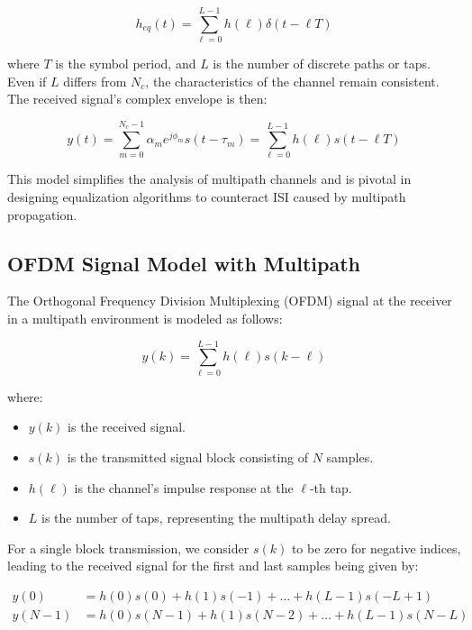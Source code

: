 \begin{equation}
    h_{eq}(t) = \sum_{\ell=0}^{L-1} h(\ell) \delta(t - \ell T)
\end{equation}

where \( T \) is the symbol period, and \( L \) is the number of discrete paths or taps. Even if \( L \) differs from \( N_c \), the characteristics of the channel remain consistent. The received signal's complex envelope is then:

\begin{equation}
    y(t) = \sum_{m=0}^{N_c-1} \alpha_m e^{j\phi_m} s(t - \tau_m) = \sum_{\ell=0}^{L-1} h(\ell) s(t - \ell T)
\end{equation}

This model simplifies the analysis of multipath channels and is pivotal in designing equalization algorithms to counteract ISI caused by multipath propagation.

\subsection*{OFDM Signal Model with Multipath}

The Orthogonal Frequency Division Multiplexing (OFDM) signal at the receiver in a multipath environment is modeled as follows:

\begin{equation}
    y(k) = \sum_{\ell=0}^{L-1} h(\ell) s(k - \ell)
\end{equation}

where:
\begin{itemize}
    \item \(y(k)\) is the received signal.
    \item \(s(k)\) is the transmitted signal block consisting of \(N\) samples.
    \item \(h(\ell)\) is the channel's impulse response at the \(\ell\)-th tap.
    \item \(L\) is the number of taps, representing the multipath delay spread.
\end{itemize}

For a single block transmission, we consider \(s(k)\) to be zero for negative indices, leading to the received signal for the first and last samples being given by:

\begin{align}
    y(0) &= h(0)s(0) + h(1)s(-1) + \ldots + h(L-1)s(-L+1) \\
    y(N-1) &= h(0)s(N-1) + h(1)s(N-2) + \ldots + h(L-1)s(N-L)
\end{align}

